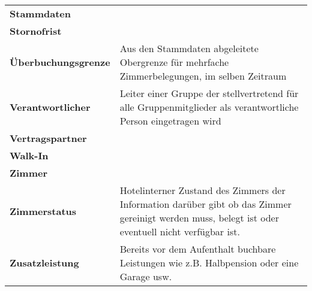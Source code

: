 \documentclass[../Pflichtenheft.tex]{subfiles}
\begin{document}
\begin{longtable}{p{5cm} p{10cm}}
        \textbf{Stammdaten} & \\[0.5cm]
        \textbf{Stornofrist} & \\[0.5cm]
        \textbf{Überbuchungsgrenze} & Aus den Stammdaten abgeleitete Obergrenze für mehrfache Zimmerbelegungen, im selben Zeitraum \\[0.5cm]
        \textbf{Verantwortlicher} & Leiter einer Gruppe der stellvertretend für alle Gruppenmitglieder als verantwortliche Person eingetragen wird \\[0.5cm]
        \textbf{Vertragspartner} & \\[0.5cm]
        \textbf{Walk-In} & \\[0.5cm]
        \textbf{Zimmer} & \\[0.5cm]
        \textbf{Zimmerstatus} & Hotelinterner Zustand des Zimmers der Information darüber gibt ob das Zimmer gereinigt werden muss, belegt ist oder eventuell nicht verfügbar ist. \\[0.5cm]
        \textbf{Zusatzleistung} & Bereits vor dem Aufenthalt buchbare Leistungen wie z.B. Halbpension oder eine Garage usw.\\[0.5cm]
    \end{longtable}
\end{document}
